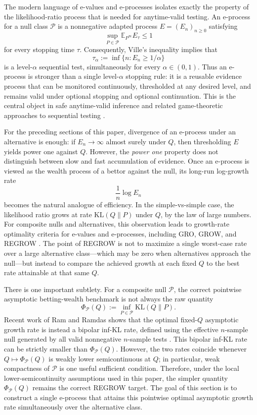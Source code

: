 \documentclass[11pt]{article}
\newcommand{\KL}{\mathrm{KL}}
\newcommand{\E}{\mathbb{E}}
\newcommand{\Pcal}{\mathcal{P}}
\theoremstyle{definition}
\theoremstyle{definition}
\begin{document}
The modern language of e-values and e-processes isolates exactly the property of the
likelihood-ratio process that is needed for anytime-valid testing.  An e-process for a null
class \(\Pcal\) is a nonnegative adapted process \(E=(E_n)_{n\ge0}\) satisfying
\[
  \sup_{P\in\Pcal} \E_{P^\infty} E_\tau \le 1
\]
for every stopping time \(\tau\).  Consequently, Ville's inequality implies that
\[
  \tau_\alpha := \inf\{n:E_n\ge 1/\alpha\}
\]
is a level-\(\alpha\) sequential test, simultaneously for every \(\alpha\in(0,1)\).  Thus an
e-process is stronger than a single level-\(\alpha\) stopping rule: it is a reusable
evidence process that can be monitored continuously, thresholded at any desired level,
and remains valid under optional stopping and optional continuation.  This is the central
object in safe anytime-valid inference and related game-theoretic approaches to
sequential testing \parencite{shafer2011,ramdas2023,grunwald2024,ruf2023composite}.

For the preceding sections of this paper, divergence of an e-process under an alternative
is enough: if \(E_n\to\infty\) almost surely under \(Q\), then thresholding \(E\) yields
power one against \(Q\).  However, the \emph{power one} property does not distinguish between slow and fast
accumulation of evidence.  Once an e-process is viewed as the wealth process of a bettor
against the null, its long-run log-growth rate
\[
  \frac1n \log E_n
\]
becomes the natural analogue of efficiency.  In the simple-vs-simple case, the likelihood
ratio grows at rate \(\KL(Q\|P)\) under \(Q\), by the law of large numbers.  For composite
nulls and alternatives, this observation leads to growth-rate optimality criteria for
e-values and e-processes, including GRO, GROW, and REGROW
\parencite{grunwald2024,larsson2025numeraire,ramramdas2026optimalbettingwealth}.
The point of REGROW is not to maximize a single worst-case rate over a large alternative
class---which may be zero when alternatives approach the null---but instead to compare
the achieved growth at each fixed \(Q\) to the best rate attainable at that same \(Q\).

There is one important subtlety.  For a composite null \(\Pcal\), the correct pointwise
asymptotic betting-wealth benchmark is not always the raw quantity
\[
  \Phi_\Pcal(Q):=\inf_{P\in\Pcal}\KL(Q\|P).
\]
Recent work of Ram and Ramdas shows that the optimal fixed-\(Q\) asymptotic growth rate
is instead a bipolar inf-KL rate, defined using the effective \(n\)-sample null generated
by all valid nonnegative \(n\)-sample tests \parencite{ramramdas2026optimalbettingwealth}.
This bipolar inf-KL rate can be strictly smaller than \(\Phi_\Pcal(Q)\).  However, the two
rates coincide whenever \(Q\mapsto \Phi_\Pcal(Q)\) is weakly lower semicontinuous at \(Q\);
in particular, weak compactness of \(\Pcal\) is one useful sufficient condition.  Therefore,
under the local lower-semicontinuity assumptions used in this paper, the simpler
quantity \(\Phi_\Pcal(Q)\) remains the correct REGROW target.  The goal of this section is
to construct a single e-process that attains this pointwise optimal asymptotic growth
rate simultaneously over the alternative class.
\end{document}
